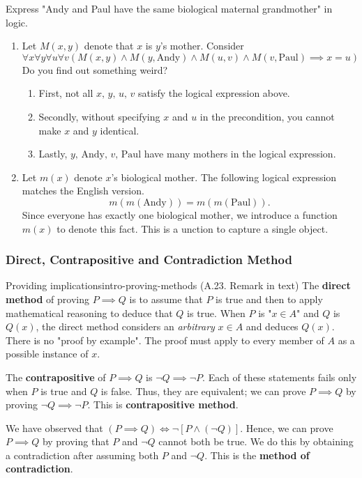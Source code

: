 \documentclass[../src/handouts/main.tex]{subfiles}
\begin{document}
Express "Andy and Paul have the same biological maternal grandmother" in logic.
\begin{enumerate}
  \item Let $M(x, y)$ denote that $x$ is $y$'s mother. Consider
    $$
      \forall x \forall y \forall u \forall v(M(x, y) \land M(y, \text{Andy}) \land M(u, v) \land M(v, \text{Paul}) \implies x = u)
    $$
    Do you find out something weird?
    \begin{enumerate}
      \item First, not all $x,\, y,\, u,\, v$ satisfy the logical expression above.
      \item Secondly, without specifying $x$ and $u$ in the precondition, you cannot make $x$ and $y$ identical.
      \item Lastly, $y,\, \text{Andy},\, v,\, \text{Paul}$ have many mothers in the logical expression.
    \end{enumerate}
  \item Let $m(x)$ denote $x$'s biological mother. The following logical expression matches the English version.
    $$
      m(m(\text{Andy}))=m(m(\text{Paul})).
    $$
    Since everyone has exactly one biological mother, we introduce a function $m(x)$ to denote this fact. This is a unction to capture a single object.
\end{enumerate}

\subsubsection{Direct, Contrapositive and Contradiction Method}

\begin{remark}{Providing implications}{intro-proving-methods}
  (A.23. Remark in text)
  The \textbf{direct method} of proving $P \implies Q$ is to assume that $P$ is true and then to apply mathematical reasoning to deduce that $Q$ is true.
  When $P$ is "$x \in A$" and $Q$ is $Q(x)$, the direct method considers an \textit{arbitrary} $x \in A$ and deduces $Q(x)$.
  There is no "proof by example".
  The proof must apply to every member of $A$ as a possible instance of $x$.

  The \textbf{contrapositive} of $P \implies Q$ is $\neg Q \implies \neg P$. Each of these statements fails only when $P$ is true and $Q$ is false. Thus, they are equivalent; we can prove $P \implies Q$ by proving $\neg Q \implies \neg P$. This is \textbf{contrapositive method}.

  We have observed that $(P \implies Q) \iff \neg \left[ P \land (\neg Q) \right]$.
  Hence, we can prove $P \implies Q$ by proving that $P$ and $\neg Q$ cannot both be true.
  We do this by obtaining a contradiction after assuming both $P$ and $\neg Q$.
  This is the \textbf{method of contradiction}.
\end{remark}
\end{document}

